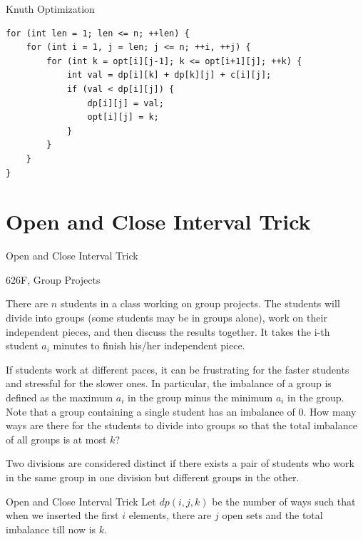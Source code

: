 \documentclass[aspectratio=169,xcolor=dvipsnames]{beamer}
\begin{document}
\begin{frame}{Knuth Optimization}
\begin{examples}
\begin{verbatim}
for (int len = 1; len <= n; ++len) {
    for (int i = 1, j = len; j <= n; ++i, ++j) {
        for (int k = opt[i][j-1]; k <= opt[i+1][j]; ++k) {
            int val = dp[i][k] + dp[k][j] + c[i][j];
            if (val < dp[i][j]) {
                dp[i][j] = val;
                opt[i][j] = k;
            }
        }
    }
}
\end{verbatim}
\end{examples}
\end{frame}

\section{Open and Close Interval Trick}
\begin{frame}[plain, t]{Open and Close Interval Trick}

{\LARGE 626F, Group Projects}

There are $n$ students in a class working on group projects. The students will divide into groups (some students may be in groups alone), work on their independent pieces, and then discuss the results together. It takes the i-th student $a_i$ minutes to finish his/her independent piece.

If students work at different paces, it can be frustrating for the faster students and stressful for the slower ones. In particular, the imbalance of a group is defined as the maximum $a_i$ in the group minus the minimum $a_i$ in the group. Note that a group containing a single student has an imbalance of 0. How many ways are there for the students to divide into groups so that the total imbalance of all groups is at most $k$?

Two divisions are considered distinct if there exists a pair of students who work in the same group in one division but different groups in the other.
\end{frame}

\begin{frame}[plain, t]{Open and Close Interval Trick}
Let $dp(i, j, k)$ be the number of ways such that when we inserted the first $i$ elements, there are $j$ open sets and the total imbalance till now is $k$.
\end{frame}
\end{document}
